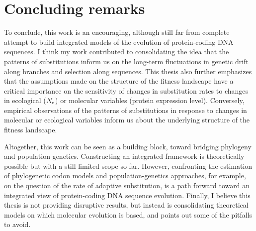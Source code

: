 \section{Concluding remarks}
\label{sec:concluding-remarks}

To conclude, this work is an encouraging, although still far from complete attempt to build integrated models of the evolution of protein-coding \acrshort{DNA} sequences.
I think my work contributed to consolidating the idea that the patterns of substitutions inform us on the long-term fluctuations in genetic drift along branches and selection along sequences.
This thesis also further emphasizes that the assumptions made on the structure of the fitness landscape have a critical importance on the sensitivity of changes in substitution rates to changes in ecological ($N_{\text{e}}$) or molecular variables (protein expression level).
Conversely, empirical observations of the patterns of substitutions in response to changes in molecular or ecological variables inform us about the underlying structure of the fitness landscape.

Altogether, this work can be seen as a building block, toward bridging phylogeny and population genetics.
Constructing an integrated framework is theoretically possible but with a still limited scope so far.
However, confronting the estimation of phylogenetic codon models and population-genetics approaches, for example, on the question of the rate of adaptive substitution, is a path forward toward an integrated view of protein-coding DNA sequence evolution.
Finally, I believe this thesis is not providing disruptive results, but instead is consolidating theoretical models on which molecular evolution is based, and points out some of the pitfalls to avoid.
